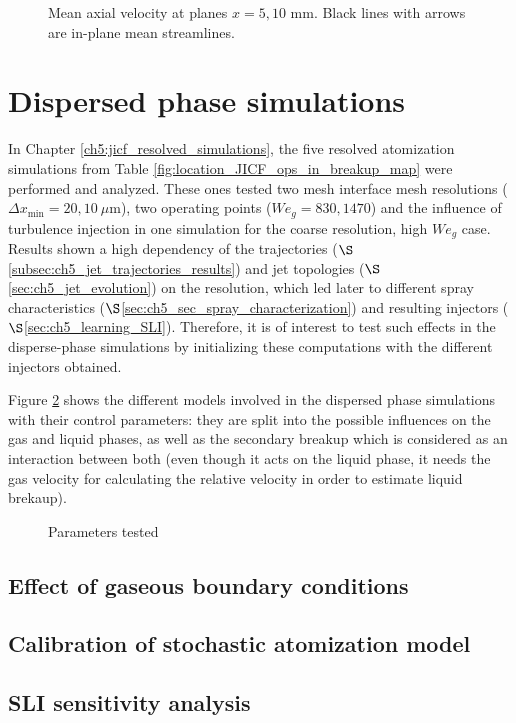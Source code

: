 \begin{figure}[ht]
\centering
\caption[Mean axial velocity at planes $x = 5, 10$ mm]{Mean axial velocity at planes $x = 5, 10$ mm. Black lines with arrows are in-plane mean streamlines.}
\label{fig:JICF_lgs_gaseous_conditions_comparison_planes_x}
\end{figure}

\clearpage

\section{Dispersed phase simulations}

In Chapter \ref{ch5:jicf_resolved_simulations}, the five resolved atomization simulations from Table \ref{fig:location_JICF_ops_in_breakup_map} were performed and analyzed. These ones tested two mesh interface mesh resolutions ($\Delta x_\mathrm{min} = 20, 10~\mu$m), two operating points ($We_g = 830, 1470$) and the influence of turbulence injection in one simulation for the coarse resolution, high $We_g$ case. Results shown a high dependency of the trajectories ($\S$\ref{subsec:ch5_jet_trajectories_results}) and jet topologies ($\S$\ref{sec:ch5_jet_evolution}) on the resolution, which led later to different spray characteristics ($\S$\ref{sec:ch5_sec_spray_characterization}) and resulting injectors ($\S$\ref{sec:ch5_learning_SLI}). Therefore, it is of interest to test such effects in the disperse-phase simulations by initializing these computations with the different injectors obtained.

Figure \ref{fig:dispersed_phase_sli_parameters} shows the different models involved in the dispersed phase simulations with their control parameters: they are split into the possible influences on the gas and liquid phases, as well as the secondary breakup which is considered as an interaction between both (even though it acts on the liquid phase, it needs the gas velocity for calculating the relative velocity in order to estimate liquid brekaup).



\begin{figure}[h!]	
	\centering	{}
	\caption{Parameters tested}
	\label{fig:dispersed_phase_sli_parameters}
\end{figure}


\subsection{Effect of gaseous boundary conditions}

\subsection{Calibration of stochastic atomization model}

\subsection{SLI sensitivity analysis}





